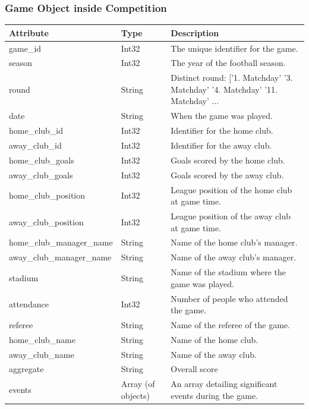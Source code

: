 \documentclass{Configuration_Files/PoliMi3i_thesis}
\begin{document}
\subsubsection{Game Object inside Competition}
    \begin{tabular}{|l|l|p{8cm}|}
        \hline
        \rowcolor{bluepoli!40}
        \textbf{Attribute}            & \textbf{Type}           & \textbf{Description} \\ \hline
    game\_id                      & Int32                   & The unique identifier for the game. \\ \hline
    season                        & Int32                   & The year of the football season. \\ \hline
    round                         & String                  & Distinct round: ['1. Matchday' '3. Matchday' '4. Matchday' '11. Matchday'  $\ldots$    \\ \hline
    date                          & String                  & When the game was played. \\ \hline
    home\_club\_id                & Int32                   & Identifier for the home club. \\ \hline
    away\_club\_id                & Int32                   & Identifier for the away club. \\ \hline
    home\_club\_goals             & Int32                   & Goals scored by the home club. \\ \hline
    away\_club\_goals             & Int32                   & Goals scored by the away club. \\ \hline
    home\_club\_position          & Int32                   & League position of the home club at game time. \\ \hline
    away\_club\_position          & Int32                   & League position of the away club at game time. \\ \hline
    home\_club\_manager\_name     & String                  & Name of the home club's manager. \\ \hline
    away\_club\_manager\_name     & String                  & Name of the away club's manager. \\ \hline
    stadium                       & String                  & Name of the stadium where the game was played. \\ \hline
    attendance                    & Int32                   & Number of people who attended the game. \\ \hline
    referee                       & String                  & Name of the referee of the game. \\ \hline
    home\_club\_name              & String                  & Name of the home club. \\ \hline
    away\_club\_name              & String                  & Name of the away club. \\ \hline
    aggregate                     & String                  & Overall score \\ \hline
    events                        & Array (of objects)      & An array detailing significant events during the game. \\ \hline
    \end{tabular}
\end{document}
